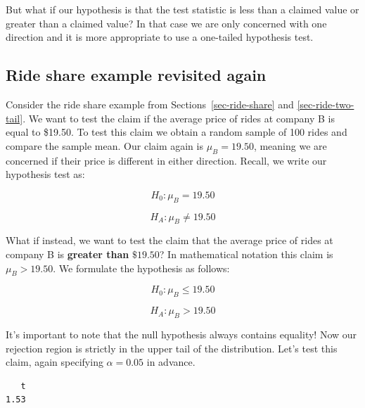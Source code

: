 \documentclass[
  letterpaper,
  DIV=11,
  numbers=noendperiod]{scrreprt}
\newenvironment{Shaded}{\begin{snugshade}}{\end{snugshade}}
\newcommand{\AttributeTok}[1]{\textcolor[rgb]{0.40,0.45,0.13}{#1}}
\newcommand{\FloatTok}[1]{\textcolor[rgb]{0.68,0.00,0.00}{#1}}
\newcommand{\FunctionTok}[1]{\textcolor[rgb]{0.28,0.35,0.67}{#1}}
\newcommand{\NormalTok}[1]{\textcolor[rgb]{0.00,0.23,0.31}{#1}}
\newcommand{\OtherTok}[1]{\textcolor[rgb]{0.00,0.23,0.31}{#1}}
\newcommand{\SpecialCharTok}[1]{\textcolor[rgb]{0.37,0.37,0.37}{#1}}
\newcommand{\StringTok}[1]{\textcolor[rgb]{0.13,0.47,0.30}{#1}}
\theoremstyle{definition}
\theoremstyle{remark}
\begin{document}
But what if our hypothesis is that the test statistic is less than a
claimed value or greater than a claimed value? In that case we are only
concerned with one direction and it is more appropriate to use a
one-tailed hypothesis test.

\hypertarget{ride-share-example-revisited-again}{%
\subsection{Ride share example revisited
again}\label{ride-share-example-revisited-again}}

Consider the ride share example from Sections~\ref{sec-ride-share} and
\ref{sec-ride-two-tail}. We want to test the claim if the average price
of rides at company B is equal to \$19.50. To test this claim we obtain
a random sample of 100 rides and compare the sample mean. Our claim
again is \(\mu_B = 19.50\), meaning we are concerned if their price is
different in either direction. Recall, we write our hypothesis test as:

\[H_0: \mu_B = 19.50\]

\[H_A: \mu_B \neq 19.50\]

What if instead, we want to test the claim that the average price of
rides at company B is \textbf{greater than} \(\$19.50\)? In mathematical
notation this claim is \(\mu_B > 19.50\). We formulate the hypothesis as
follows:

\[H_0: \mu_B \leq 19.50\]

\[H_A: \mu_B > 19.50\]

It's important to note that the null hypothesis always contains
equality! Now our rejection region is strictly in the upper tail of the
distribution. Let's test this claim, again specifying \(\alpha = 0.05\)
in advance.

\begin{Shaded}
\end{Shaded}

\begin{verbatim}
   t 
1.53 
\end{verbatim}
\end{document}
